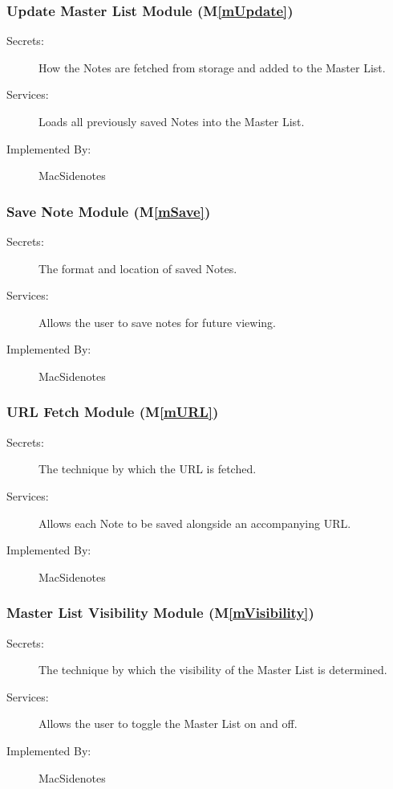 \documentclass[12pt, titlepage]{article}
\newcommand{\mref}[1]{M\ref{#1}}
\begin{document}
\subsubsection{Update Master List Module (\mref{mUpdate})}

\begin{description}
	\item[Secrets:]How the Notes are fetched from storage and added to the 
	Master List.
	\item[Services:]Loads all previously saved Notes into the Master List.
	\item[Implemented By:] MacSidenotes
\end{description}

\subsubsection{Save Note Module (\mref{mSave})}

\begin{description}
	\item[Secrets:]The format and location of saved Notes.
	\item[Services:]Allows the user to save notes for future viewing.
	\item[Implemented By:] MacSidenotes
\end{description}

\subsubsection{URL Fetch Module (\mref{mURL})}

\begin{description}
	\item[Secrets:]The technique by which the URL is fetched.
	\item[Services:]Allows each Note to be saved alongside an accompanying URL.
	\item[Implemented By:] MacSidenotes
\end{description}

\subsubsection{Master List Visibility Module (\mref{mVisibility})}

\begin{description}
	\item[Secrets:]The technique by which the visibility of the Master List is 
	determined.
	\item[Services:]Allows the user to toggle the Master List on and off.
	\item[Implemented By:] MacSidenotes
\end{description}
\end{document}
